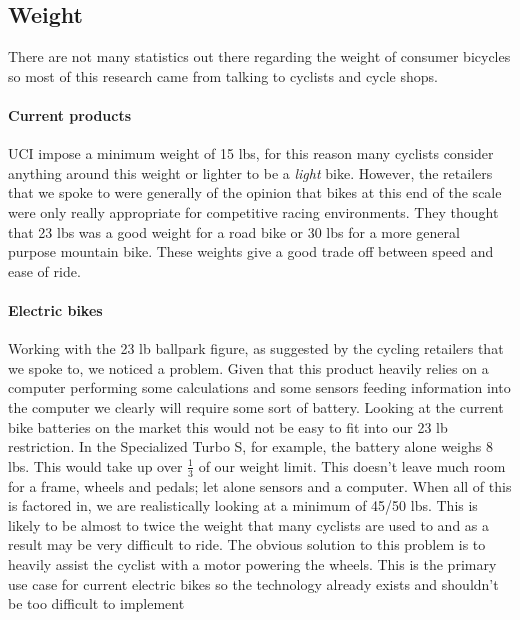 \documentclass[]{report}
\begin{document}
\subsection{Weight}
There are not many statistics out there regarding the weight of consumer bicycles so most of this research came from talking to cyclists and cycle shops.
\paragraph{Current products}
UCI impose a minimum weight of 15 lbs, for this reason many cyclists consider anything around this weight or lighter to be a \textit{light} bike. However, the retailers that we spoke to were generally of the opinion that bikes at this end of the scale were only really appropriate for competitive racing environments. They thought that 23 lbs was a good weight for a road bike or 30 lbs for a more general purpose mountain bike. These weights give a good trade off between speed and ease of ride.

\paragraph{Electric bikes}
Working with the 23 lb ballpark figure, as suggested by the cycling retailers that we spoke to, we noticed a problem. Given that this product heavily relies on a computer performing some calculations and some sensors feeding information into the computer we clearly will require some sort of battery. Looking at the current bike batteries on the market this would not be easy to fit into our 23 lb restriction. In the Specialized Turbo S, for example, the battery alone weighs 8 lbs\cite{turbo-s}. This would take up over $ \frac{1}{3} $ of our weight limit. This doesn't leave much room for a frame, wheels and pedals; let alone sensors and a computer. When all of this is factored in, we are realistically looking at a minimum of 45/50 lbs. This is likely to be almost to twice the weight that many cyclists are used to and as a result may be very difficult to ride. The obvious solution to this problem is to heavily assist the cyclist with a motor powering the wheels. This is the primary use case for current electric bikes so the technology already exists and shouldn't be too difficult to implement
\end{document}
